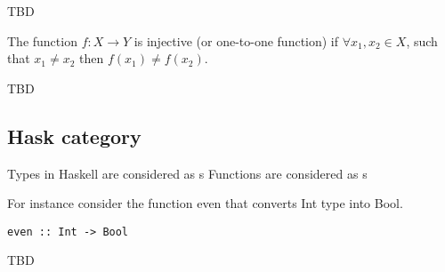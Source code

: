 \begin{remark}
\label{rem:surjection_epimorphism}
TBD
\end{remark}

\begin{definition}[Injection]
  \label{def:injection}
  The function $f: X \rightarrow Y$ is injective (or one-to-one function) if
  $\forall x_1, x_2 \in X$, such that $x_1 \ne x_2$ then
  $f\left(x_1\right) \ne f\left(x_2\right)$.
\end{definition}

\begin{remark}
\label{rem:injection_monomorphism}
TBD
\end{remark}


\subsection{\textbf{Hask} category}
\begin{example}
\label{ex:haskcategory}
Types in Haskell are considered as s
Functions are considered as s

For instance consider the function even that converts Int type
into Bool.
\begin{verbatim}
even :: Int -> Bool
\end{verbatim}
\end{example}


TBD
